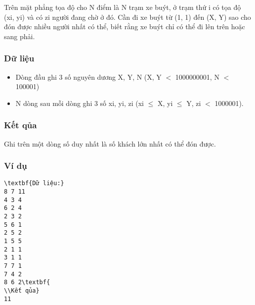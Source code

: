 



   Trên mặt phẳng tọa độ cho N điểm là N trạm xe buýt, ở trạm thứ i có tọa độ (xi, yi) và có zi người đang chờ ở đó. Cần đi xe buýt từ (1, 1) đến (X, Y) sao cho đón được nhiều người nhất có thể, biết rằng xe buýt chỉ có thể đi lên trên hoặc sang phải.  

\subsubsection{   Dữ liệu  }
\begin{itemize}
	\item     Dòng đầu ghi 3 số nguyên dương X, Y, N (X, Y $<$ 1000000001, N $<$ 100001)   
	\item     N dòng sau mỗi dòng ghi 3 số xi, yi, zi (xi  $\le$  X, yi  $\le$  Y, zi $<$ 1000001).   
\end{itemize}

\subsubsection{   Kết qủa  }

   Ghi trên một dòng số duy nhất là số khách lớn nhất có thể đón được.  

\subsubsection{   Ví dụ  }
\begin{verbatim}
\textbf{Dữ liệu:} 
8 7 11
4 3 4
6 2 4
2 3 2
5 6 1
2 5 2
1 5 5
2 1 1
3 1 1
7 7 1
7 4 2
8 6 2\textbf{
\\Kết qủa} 
11
\end{verbatim}
